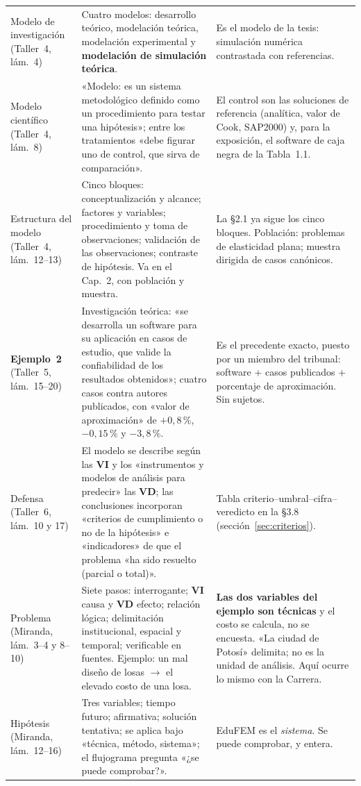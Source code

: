 \documentclass[11pt,a4paper]{article}
\newcommand{\vi}{\textbf{VI}}
\newcommand{\vd}{\textbf{VD}}
\begin{document}
{\begin{longtable}{L{3.6cm}L{6.4cm}L{5.7cm}}
Modelo de investigación (Taller~4, lám.~4) & Cuatro modelos: desarrollo teórico, modelación teórica, modelación experimental y \textbf{modelación de simulación teórica}. & Es el modelo de la tesis: simulación numérica contrastada con referencias. \\
Modelo científico (Taller~4, lám.~8) & «Modelo: es un sistema metodológico definido como un procedimiento para testar una hipótesis»; entre los tratamientos «debe figurar uno de control, que sirva de comparación». & El control son las soluciones de referencia (analítica, valor de Cook, SAP2000) y, para la exposición, el software de caja negra de la Tabla~1.1. \\
Estructura del modelo (Taller~4, lám.~12--13) & Cinco bloques: conceptualización y alcance; factores y variables; procedimiento y toma de observaciones; validación de las observaciones; contraste de hipótesis. Va en el Cap.~2, con población y muestra. & La §2.1 ya sigue los cinco bloques. Población: problemas de elasticidad plana; muestra dirigida de casos canónicos. \\
\textbf{Ejemplo~2} (Taller~5, lám.~15--20) & Investigación teórica: «se desarrolla un software para su aplicación en casos de estudio, que valide la confiabilidad de los resultados obtenidos»; cuatro casos contra autores publicados, con «valor de aproximación» de $+0{,}8\,\%$, $-0{,}15\,\%$ y $-3{,}8\,\%$. & Es el precedente exacto, puesto por un miembro del tribunal: software + casos publicados + porcentaje de aproximación. Sin sujetos. \\
Defensa (Taller~6, lám.~10 y 17) & El modelo se describe según las \vi{} y los «instrumentos y modelos de análisis para predecir» las \vd; las conclusiones incorporan «criterios de cumplimiento o no de la hipótesis» e «indicadores» de que el problema «ha sido resuelto (parcial o total)». & Tabla criterio--umbral--cifra--veredicto en la §3.8 (sección~\ref{sec:criterios}). \\
Problema (Miranda, lám.~3--4 y 8--10) & Siete pasos: interrogante; \vi{} causa y \vd{} efecto; relación lógica; delimitación institucional, espacial y temporal; verificable en fuentes. Ejemplo: un mal diseño de losas $\to$ el elevado costo de una losa. & \textbf{Las dos variables del ejemplo son técnicas} y el costo se calcula, no se encuesta. «La ciudad de Potosí» delimita; no es la unidad de análisis. Aquí ocurre lo mismo con la Carrera. \\
Hipótesis (Miranda, lám.~12--16) & Tres variables; tiempo futuro; afirmativa; solución tentativa; se aplica bajo «técnica, método, sistema»; el flujograma pregunta «¿se puede comprobar?». & EduFEM es el \emph{sistema}. Se puede comprobar, y entera. \\

\end{longtable}}
\end{document}
